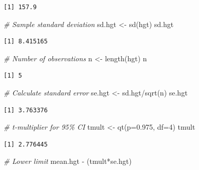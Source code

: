 \documentclass[
  oneside]{krantz}
\newenvironment{Shaded}{\begin{snugshade}}{\end{snugshade}}
\newcommand{\AttributeTok}[1]{\textcolor[rgb]{0.77,0.63,0.00}{#1}}
\newcommand{\CommentTok}[1]{\textcolor[rgb]{0.56,0.35,0.01}{\textit{#1}}}
\newcommand{\DecValTok}[1]{\textcolor[rgb]{0.00,0.00,0.81}{#1}}
\newcommand{\FloatTok}[1]{\textcolor[rgb]{0.00,0.00,0.81}{#1}}
\newcommand{\FunctionTok}[1]{\textcolor[rgb]{0.00,0.00,0.00}{#1}}
\newcommand{\NormalTok}[1]{#1}
\newcommand{\OtherTok}[1]{\textcolor[rgb]{0.56,0.35,0.01}{#1}}
\newcommand{\SpecialCharTok}[1]{\textcolor[rgb]{0.00,0.00,0.00}{#1}}
\begin{document}
\begin{verbatim}
[1] 157.9
\end{verbatim}

\begin{Shaded}
\begin{Highlighting}[]
\CommentTok{\# Sample standard deviation}
\NormalTok{sd.hgt }\OtherTok{\textless{}{-}} \FunctionTok{sd}\NormalTok{(hgt)}
\NormalTok{sd.hgt}
\end{Highlighting}
\end{Shaded}

\begin{verbatim}
[1] 8.415165
\end{verbatim}

\begin{Shaded}
\begin{Highlighting}[]
\CommentTok{\# Number of observations}
\NormalTok{n }\OtherTok{\textless{}{-}} \FunctionTok{length}\NormalTok{(hgt)}
\NormalTok{n}
\end{Highlighting}
\end{Shaded}

\begin{verbatim}
[1] 5
\end{verbatim}

\begin{Shaded}
\begin{Highlighting}[]
\CommentTok{\# Calculate standard error}
\NormalTok{se.hgt }\OtherTok{\textless{}{-}}\NormalTok{ sd.hgt}\SpecialCharTok{/}\FunctionTok{sqrt}\NormalTok{(n)}
\NormalTok{se.hgt}
\end{Highlighting}
\end{Shaded}

\begin{verbatim}
[1] 3.763376
\end{verbatim}

\begin{Shaded}
\begin{Highlighting}[]
\CommentTok{\# t{-}multiplier for 95\% CI}
\NormalTok{tmult }\OtherTok{\textless{}{-}} \FunctionTok{qt}\NormalTok{(}\AttributeTok{p=}\FloatTok{0.975}\NormalTok{, }\AttributeTok{df=}\DecValTok{4}\NormalTok{)}
\NormalTok{tmult}
\end{Highlighting}
\end{Shaded}

\begin{verbatim}
[1] 2.776445
\end{verbatim}

\begin{Shaded}
\begin{Highlighting}[]
\CommentTok{\# Lower limit}
\NormalTok{mean.hgt }\SpecialCharTok{{-}}\NormalTok{ (tmult}\SpecialCharTok{*}\NormalTok{se.hgt)}
\end{Highlighting}
\end{Shaded}
\end{document}
